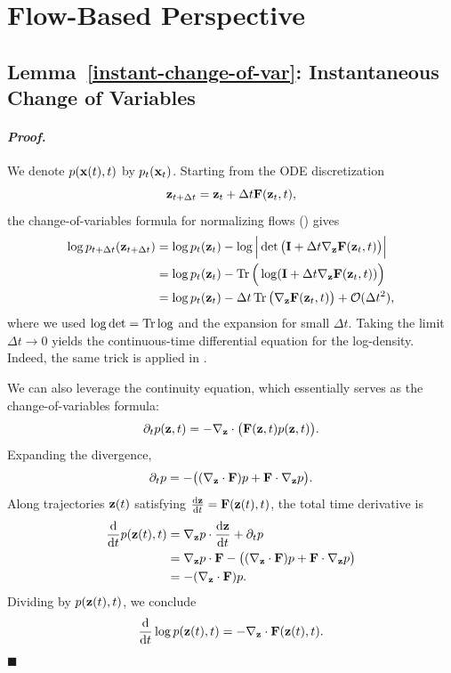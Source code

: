 \clearpage
\newpage

\section{Flow-Based Perspective}\label{app-sec:flow-proof}

\subsection{Lemma~\ref{instant-change-of-var}: Instantaneous Change of Variables}
\paragraph{\textit{Proof.}}

 We denote $p({\mathbf{x}}(t), t)$ by $p_t({\mathbf{x}}_t)$. Starting from the ODE discretization
\[
{\mathbf{z}}_{t+\Delta t} = {\mathbf{z}}_t + \Delta t  {\mathbf{F}}({\mathbf{z}}_t, t),
\]
the change-of-variables formula for normalizing flows () gives
\begin{align*}
    \log p_{t+\Delta t}({\mathbf{z}}_{t+\Delta t}) 
    &= \log p_t({\mathbf{z}}_t) - \log \Big| \det\big({\mathbf{I}} + \Delta t \nabla_{{\mathbf{z}}} {\mathbf{F}}({\mathbf{z}}_t, t)\big) \Big| \\
    &= \log p_t({\mathbf{z}}_t) - \operatorname{Tr}\Big(\log({\mathbf{I}} + \Delta t \nabla_{{\mathbf{z}}} {\mathbf{F}}({\mathbf{z}}_t, t)) \Big) \\
    &= \log p_t({\mathbf{z}}_t) - \Delta t  \operatorname{Tr}\big(\nabla_{{\mathbf{z}}} {\mathbf{F}}({\mathbf{z}}_t, t)\big) + \mathcal{O}(\Delta t^2),
\end{align*}
where we used $\log \det = \operatorname{Tr} \log$ and the expansion for small $\Delta t$.
Taking the limit $\Delta t \to 0$ yields the continuous-time differential equation for the log-density. Indeed, the same trick is applied in .

\vspace{0.3cm}
 We can also leverage the continuity equation, which essentially serves as the change-of-variables formula:
\[
\partial_t p({\mathbf{z}},t) = - \nabla_{{\mathbf{z}}} \cdot \big({\mathbf{F}}({\mathbf{z}},t) p({\mathbf{z}},t)\big).
\]
Expanding the divergence,
\[
\partial_t p = - \big( (\nabla_{{\mathbf{z}}} \cdot {\mathbf{F}}) p + {\mathbf{F}} \cdot \nabla_{{\mathbf{z}}} p \big).
\]
Along trajectories ${\mathbf{z}}(t)$ satisfying $\frac{\mathop{}\!\mathrm{d} {\mathbf{z}}}{\mathop{}\!\mathrm{d} t} = {\mathbf{F}}({\mathbf{z}}(t), t)$, the total time derivative is
\begin{align*}
\frac{\mathop{}\!\mathrm{d}}{\mathop{}\!\mathrm{d} t} p({\mathbf{z}}(t), t) 
&= \nabla_{{\mathbf{z}}} p \cdot \frac{\mathop{}\!\mathrm{d} {\mathbf{z}}}{\mathop{}\!\mathrm{d} t} + \partial_t p \\
&= \nabla_{{\mathbf{z}}} p \cdot {\mathbf{F}} - \big( (\nabla_{{\mathbf{z}}} \cdot {\mathbf{F}}) p + {\mathbf{F}} \cdot \nabla_{{\mathbf{z}}} p \big) \\
&= - (\nabla_{{\mathbf{z}}} \cdot {\mathbf{F}}) p.
\end{align*}
Dividing by $p({\mathbf{z}}(t), t)$, we conclude
\[
\frac{\mathop{}\!\mathrm{d}}{\mathop{}\!\mathrm{d} t} \log p({\mathbf{z}}(t), t) = - \nabla_{{\mathbf{z}}} \cdot {\mathbf{F}}({\mathbf{z}}(t), t).
\]
\hfill$\blacksquare$


